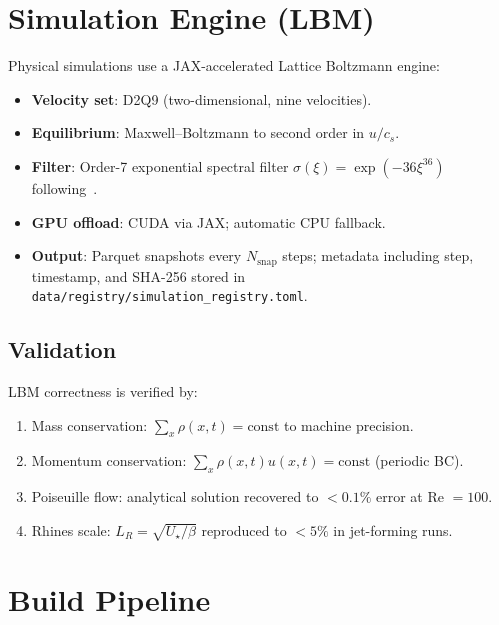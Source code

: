 \section{Simulation Engine (LBM)}
\label{app:lbm_engine}

Physical simulations use a JAX-accelerated Lattice Boltzmann engine:

\begin{itemize}
    \item \textbf{Velocity set}: D2Q9 (two-dimensional, nine velocities).
    \item \textbf{Equilibrium}: Maxwell--Boltzmann to second order in $u/c_s$.
    \item \textbf{Filter}: Order-7 exponential spectral filter
          $\sigma(\xi) = \exp(-36\xi^{36})$ following~\cite{hou2007computing}.
    \item \textbf{GPU offload}: CUDA via JAX; automatic CPU fallback.
    \item \textbf{Output}: Parquet snapshots every $N_{\mathrm{snap}}$ steps;
          metadata including step, timestamp, and SHA-256 stored in
          \texttt{data/registry/simulation\_registry.toml}.
\end{itemize}

\subsection{Validation}

LBM correctness is verified by:
\begin{enumerate}
    \item Mass conservation: $\sum_x \rho(x,t) = \text{const}$ to
          machine precision.
    \item Momentum conservation: $\sum_x \rho(x,t) u(x,t) =
          \text{const}$ (periodic BC).
    \item Poiseuille flow: analytical solution recovered to $< 0.1\%$
          error at Re $= 100$.
    \item Rhines scale: $L_R = \sqrt{U_\star / \beta}$ reproduced to
          $< 5\%$ in jet-forming runs.
\end{enumerate}

\section{Build Pipeline}
\label{app:build}

